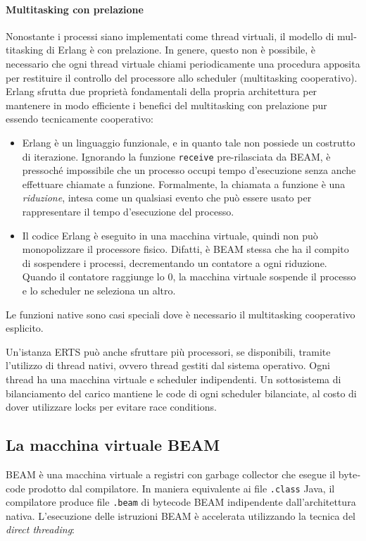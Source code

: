 \documentclass[target=bach,aauheader=,style=]{thud}
\newcommand{\eng}[1]{\foreignlanguage{english}{#1}}
\begin{document}
\paragraph{\eng{Multitasking} con prelazione}
Nonostante i processi siano implementati come thread virtuali, il modello di \eng{multitasking} di Erlang è con prelazione. In genere, questo non è possibile, è necessario che ogni thread virtuale chiami periodicamente una procedura apposita per restituire il controllo del processore allo scheduler (\eng{multitasking} cooperativo). Erlang sfrutta due proprietà fondamentali della propria architettura per mantenere in modo efficiente i benefici del \eng{multitasking} con prelazione pur essendo tecnicamente cooperativo:
\begin{itemize}
    \item Erlang è un linguaggio funzionale, e in quanto tale non possiede un costrutto di iterazione. Ignorando la funzione \lstinline{receive} pre-rilasciata da BEAM, è pressoché impossibile che un processo occupi tempo d'esecuzione senza anche effettuare chiamate a funzione. Formalmente, la chiamata a funzione è una \emph{riduzione}, intesa come un qualsiasi evento che può essere usato per rappresentare il tempo d'esecuzione del processo.
    \item Il codice Erlang è eseguito in una macchina virtuale, quindi non può monopolizzare il processore fisico. Difatti, è BEAM stessa che ha il compito di sospendere i processi, decrementando un contatore a ogni riduzione. Quando il contatore raggiunge lo $0$, la macchina virtuale sospende il processo e lo scheduler ne seleziona un altro.
\end{itemize}
Le funzioni native sono casi speciali dove è necessario il \eng{multitasking} cooperativo esplicito.
\bigskip

Un’istanza ERTS può anche sfruttare più processori, se disponibili, tramite l'utilizzo di thread nativi, ovvero thread gestiti dal sistema operativo. Ogni thread ha una macchina virtuale e scheduler indipendenti. Un sottosistema di bilanciamento del carico mantiene le code di ogni scheduler bilanciate, al costo di dover utilizzare \eng{locks} per evitare \eng{race conditions}.

\subsection{La macchina virtuale BEAM}

BEAM è una macchina virtuale a registri con \eng{garbage collector} che esegue il \eng{bytecode} prodotto dal compilatore. In maniera equivalente ai file \lstinline{.class} Java, il compilatore produce file \lstinline{.beam} di \eng{bytecode} BEAM indipendente dall'architettura nativa. L'esecuzione delle istruzioni BEAM è accelerata utilizzando la tecnica del \emph{\eng{direct threading}}:
\end{document}
